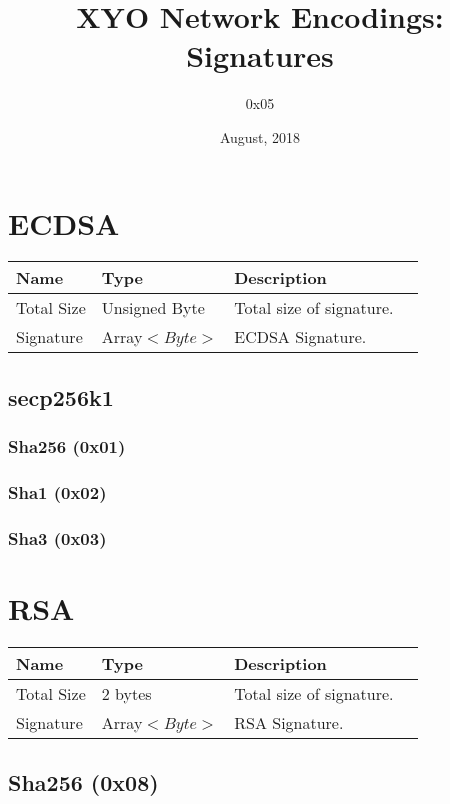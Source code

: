 \documentclass[11pt]{article}
\title{XYO Network Encodings: Signatures}
\author{0x05}
\date{August, 2018}
\begin{document}
\maketitle

\section{ECDSA}

\begin{center}
\begin{tabular}{ |l|l|l|l| } 
\hline
\textbf{Name} & \textbf{Type} & \textbf{Description}\\
\hline
Total Size & Unsigned Byte & Total size of signature. \\
Signature & Array$<Byte>$ & ECDSA Signature.\\ 
   
\hline
\end{tabular}
\end{center}

\subsection{secp256k1}
\subsubsection{Sha256 (0x01)} 
\subsubsection{Sha1 (0x02)} 
\subsubsection{Sha3 (0x03)} 

\section{RSA}
\begin{center}
\begin{tabular}{ |l|l|l|l| } 
\hline
\textbf{Name} & \textbf{Type} & \textbf{Description}\\
\hline
Total Size & 2 bytes & Total size of signature. \\
Signature & Array$<Byte>$ & RSA Signature.\\ 
   
\hline
\end{tabular}
\end{center}
\subsection{Sha256 (0x08)} 
\end{document}
